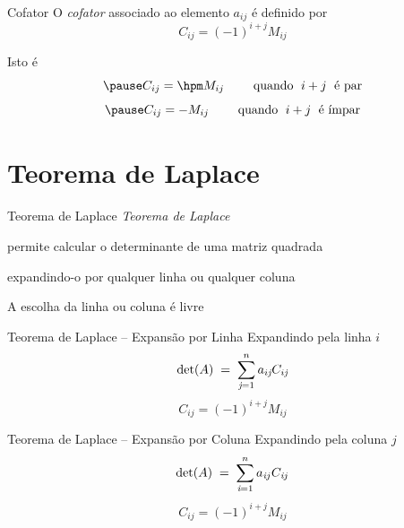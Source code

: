 \documentclass[fleqn,aspectratio=169,12pt]{beamer}
\begin{document}


\begin{frame}{Cofator}
  O \emph{cofator} associado ao elemento $a_{ij}$ é definido por
  \pause
  \[
    C_{ij} = (-1)^{i+j }M_{ij}
  \]

  \pause
  \bigskip
  Isto é
  \[
    \pause
    C_{ij} = \hpm M_{ij}
    \qquad
    \text{ quando } \;i+j\; \text{ é par}
  \]
  \[
    \pause
    C_{ij} = -M_{ij}
    \qquad
    \text{ quando } \;i+j\; \text{ é ímpar}
  \]
\end{frame}



\section{Teorema de Laplace}

\begin{frame}{Teorema de Laplace}
  \emph{Teorema de Laplace}

  \pause
  permite calcular o determinante de uma matriz quadrada

  \pause
  expandindo-o por qualquer linha ou qualquer coluna

  \pause
  \bigskip
  \bigskip
  A escolha da linha ou coluna é livre
\end{frame}

\begin{frame}{Teorema de Laplace -- Expansão por Linha}
  Expandindo pela linha $i$
  \[
    \det(A) \;=\;
    \sum_{\emph{j}=1}^{n} a_{i\emph{j}} C_{i\emph{j}}
  \]
  \[
    C_{ij} = (-1)^{i+j }M_{ij}
  \]
\end{frame}

\begin{frame}{Teorema de Laplace -- Expansão por Coluna}
  Expandindo pela coluna $j$
  \[
    \det(A) \;=\;
    \sum_{\vphantom{j}\emph{i}=1}^{n} a_{\emph{i}j} C_{\emph{i}j}
  \]
  \[
    C_{ij} = (-1)^{i+j }M_{ij}
  \]
\end{frame}
\end{document}
